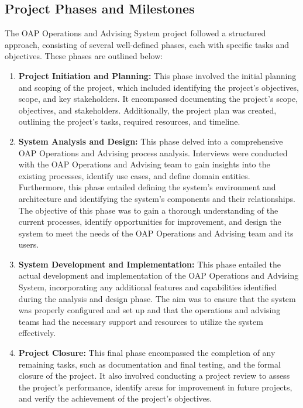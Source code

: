\documentclass[12pt]{article}
\begin{document}
\subsection{Project Phases and Milestones} 
The OAP Operations and Advising System project followed a structured approach, consisting of several well-defined phases, each with specific tasks and objectives. These phases are outlined below:

\begin{enumerate}[label=(\roman*)] 
    \item \textbf{Project Initiation and Planning:} This phase involved the initial planning and scoping of the project, which included identifying the project's objectives, scope, and key stakeholders. It encompassed documenting the project's scope, objectives, and stakeholders. Additionally, the project plan was created, outlining the project's tasks, required resources, and timeline.
    \item \textbf{System Analysis and Design:} This phase delved into a comprehensive OAP Operations and Advising process analysis. Interviews were conducted with the OAP Operations and Advising team to gain insights into the existing processes, identify use cases, and define domain entities. Furthermore, this phase entailed defining the system's environment and architecture and identifying the system's components and their relationships. The objective of this phase was to gain a thorough understanding of the current processes, identify opportunities for improvement, and design the system to meet the needs of the OAP Operations and Advising team and its users.
    \item \textbf{System Development and Implementation:} This phase entailed the actual development and implementation of the OAP Operations and Advising System, incorporating any additional features and capabilities identified during the analysis and design phase. The aim was to ensure that the system was properly configured and set up and that the operations and advising teams had the necessary support and resources to utilize the system effectively.
    \item \textbf{Project Closure:} This final phase encompassed the completion of any remaining tasks, such as documentation and final testing, and the formal closure of the project. It also involved conducting a project review to assess the project's performance, identify areas for improvement in future projects, and verify the achievement of the project's objectives.
\end{enumerate}
\end{document}
